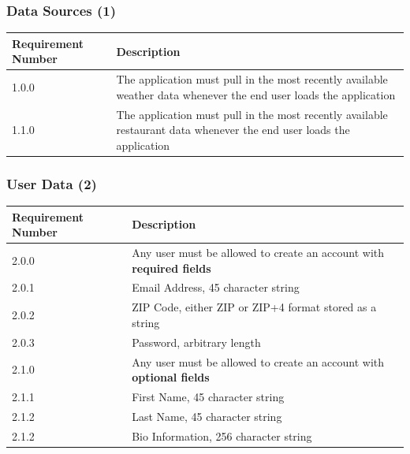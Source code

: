 \documentclass[12pt]{article}
\begin{document}
\subsubsection{Data Sources (1)}

\setlength{\tabcolsep}{1cm}
\begin{tabular}{|l|p{8cm}|}
    \hline
    Requirement Number & Description                                                                                                          \\

    \hline\hline
    1.0.0              & The application must pull in the most recently available weather data whenever the end user loads the application    \\

    \hline\hline
    1.1.0              & The application must pull in the most recently available restaurant data whenever the end user loads the application \\
    \hline
\end{tabular}

\subsubsection{User Data (2)}

\setlength{\tabcolsep}{1cm}
\begin{tabular}{|l|p{8cm}|}
    \hline
    Requirement Number & Description                                                            \\

    \hline\hline
    2.0.0              & Any user must be allowed to create an account with \bf required fields \\
    \hline
    2.0.1              & Email Address, 45 character string                                     \\
    \hline
    2.0.2              & ZIP Code, either ZIP or ZIP+4 format stored as a string                \\ \hline
    2.0.3              & Password, arbitrary length                                             \\

    \hline\hline
    2.1.0              & Any user must be allowed to create an account with \bf optional fields \\
    \hline
    2.1.1              & First Name, 45 character string                                        \\
    \hline
    2.1.2              & Last Name, 45 character string                                         \\
    \hline
    2.1.2              & Bio Information, 256 character string                                  \\
    \hline
\end{tabular}
\end{document}
